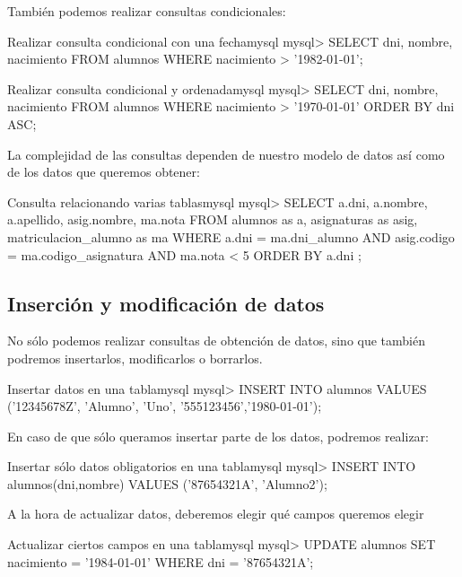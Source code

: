 También podemos realizar consultas condicionales:

\begin{mycode}{Realizar consulta condicional con una fecha}{mysql}{}
mysql> SELECT dni, nombre, nacimiento
            FROM alumnos
            WHERE nacimiento > '1982-01-01';
\end{mycode}


\begin{mycode}{Realizar consulta condicional y ordenada}{mysql}{}
mysql> SELECT dni, nombre, nacimiento
            FROM alumnos
            WHERE nacimiento > '1970-01-01'
            ORDER BY dni ASC;
\end{mycode}


La complejidad de las consultas dependen de nuestro modelo de datos así como de los datos que queremos obtener:

\begin{mycode}{Consulta relacionando varias tablas}{mysql}{{\small }}
mysql> SELECT a.dni, a.nombre, a.apellido, asig.nombre, ma.nota
            FROM alumnos as a, asignaturas as asig, matriculacion_alumno as ma
            WHERE a.dni = ma.dni_alumno
                AND asig.codigo = ma.codigo_asignatura
                AND ma.nota < 5
            ORDER BY a.dni ;
\end{mycode}


\subsection{Inserción y modificación de datos}
No sólo podemos realizar consultas de obtención de datos, sino que también podremos insertarlos, modificarlos o borrarlos.

\begin{mycode}{Insertar datos en una tabla}{mysql}{\scriptsize}
mysql> INSERT INTO alumnos VALUES ('12345678Z', 'Alumno', 'Uno', '555123456','1980-01-01');
\end{mycode}

En caso de que sólo queramos insertar parte de los datos, podremos realizar:

\begin{mycode}{Insertar sólo datos obligatorios en una tabla}{mysql}{}
mysql> INSERT INTO alumnos(dni,nombre) VALUES ('87654321A', 'Alumno2');
\end{mycode}

A la hora de actualizar datos, deberemos elegir qué campos queremos elegir

\begin{mycode}{Actualizar ciertos campos en una tabla}{mysql}{\small}
mysql> UPDATE alumnos SET nacimiento = '1984-01-01' WHERE dni = '87654321A';
\end{mycode}

